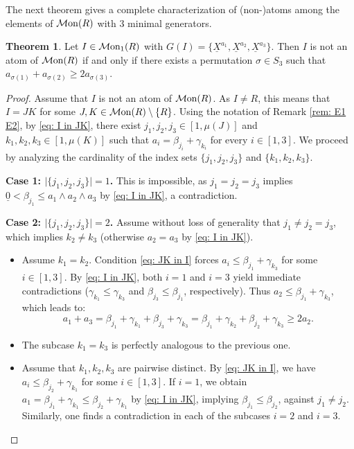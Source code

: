 \documentclass[a4paper,10pt,reqno]{amsart}
\theoremstyle{definition}
\newtheorem{theorem}{Theorem}[section]
\theoremstyle{definition}
\providecommand\Mon{{\mathcal{M}{\rm on}}}
\begin{document}
The next theorem gives a complete characterization of (non-)atoms among the elements of $\Mon(R)$ with $3$ minimal generators. 
\begin{theorem}\label{thm: 3-generated}
Let $I\in \Mon_1(R)$ with $G(I) = \{\underline X^{a_1},\underline X^{a_{2}}, \underline X^{a_3}\}$. Then $I$ is not an atom of $\Mon(R)$ if and only if there exists a permutation $\sigma\in S_3$ such that $a_{\sigma(1)}+a_{\sigma(2)}\ge 2a_{\sigma(3)}$.
\end{theorem}
\begin{proof}
Assume that $I$ is not an atom of $\Mon(R)$. As $I\ne R$, this means that $I=JK$ for some $J,K\in\Mon(R)\setminus\{R\}$. Using the notation of Remark \ref{rem: E1 E2}, 
by \ref{eq: I in JK}, there exist $j_1,j_2,j_3\in [1,\mu(J)]$ and $k_1,k_2,k_3\in [1,\mu(K)]$ such that $a_i=\beta_{j_i}+\gamma_{k_i}$ for every $i\in [1,3]$. We proceed by analyzing the cardinality of the index sets $\{j_1,j_2,j_3\}$ and $\{k_1,k_2,k_3\}$.

\medskip
\noindent\textbf{Case 1: $\lvert\{j_1,j_2,j_3\}\rvert = 1$.} 
This is impossible, as $j_1=j_2=j_3$ implies $\underline{0} < \beta_{j_1} \le a_1 \wedge a_2 \wedge a_3$ by \ref{eq: I in JK}, a contradiction.

\medskip
\noindent\textbf{Case 2: $\lvert\{j_1,j_2,j_3\}\rvert = 2$.} 
Assume without loss of generality that $j_1 \neq j_2 = j_3$, which implies $k_2 \neq k_3$ (otherwise $a_2=a_3$ by \ref{eq: I in JK}). 

\begin{itemize}
    \item Assume $k_1=k_2$. Condition \ref{eq: JK in I} forces $a_i \le \beta_{j_1} + \gamma_{k_3}$ for some $i\in[1,3]$. 
    By \ref{eq: I in JK}, both $i=1$ and $i=3$ yield immediate contradictions ($\gamma_{k_1} \le \gamma_{k_3}$ and $\beta_{j_3} \le \beta_{j_1}$, respectively). Thus $a_2 \le \beta_{j_1} + \gamma_{k_3}$, which leads to:
    \[ a_1+a_3 = \beta_{j_1}+\gamma_{k_1}+\beta_{j_3}+\gamma_{k_3}=\beta_{j_1}+\gamma_{k_2}+\beta_{j_2}+\gamma_{k_3} \ge 2a_2 .\]
    \item The subcase $k_1 = k_3$ is perfectly analogous to the previous one.
    \item Assume that $k_1,k_2, k_3$ are pairwise distinct. By \ref{eq: JK in I}, we have $a_i\le \beta_{j_2}+\gamma_{k_1}$ for some $i\in [1,3]$. If $i=1$, we obtain $a_1=\beta_{j_1}+\gamma_{k_1}\le \beta_{j_2}+\gamma_{k_1}$ by \ref{eq: I in JK}, implying $\beta_{j_1}\le \beta_{j_2}$, against $j_1\neq j_2$. Similarly, one finds a contradiction in each of the subcases $i=2$ and $i=3$.
\end{itemize}


\end{proof}
\end{document}
